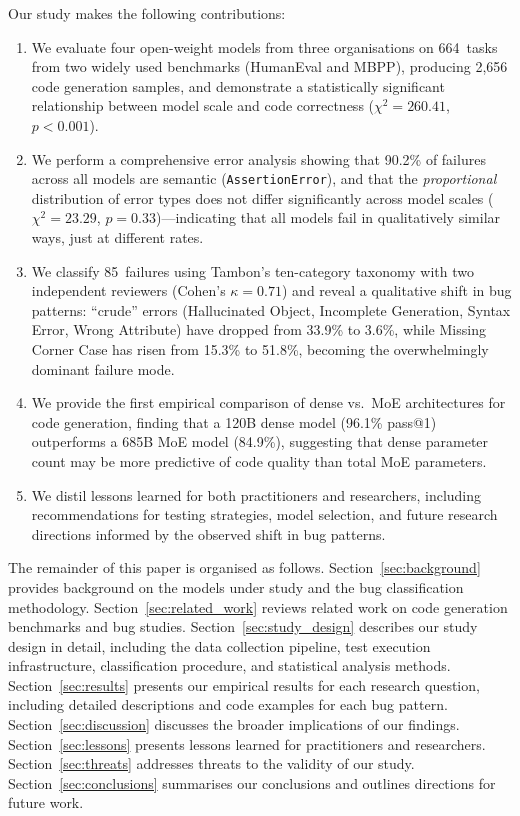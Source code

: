 \documentclass[smallextended]{svjour3}
\begin{document}
Our study makes the following contributions:

\begin{enumerate}
    \item We evaluate four open-weight models from three organisations on 664~tasks from two widely used benchmarks (HumanEval and MBPP), producing 2,656 code generation samples, and demonstrate a statistically significant relationship between model scale and code correctness ($\chi^2=260.41$, $p<0.001$).

    \item We perform a comprehensive error analysis showing that 90.2\% of failures across all models are semantic (\texttt{AssertionError}), and that the \emph{proportional} distribution of error types does not differ significantly across model scales ($\chi^2=23.29$, $p=0.33$)---indicating that all models fail in qualitatively similar ways, just at different rates.

    \item We classify 85~failures using Tambon's ten-category taxonomy with two independent reviewers (Cohen's $\kappa=0.71$) and reveal a qualitative shift in bug patterns: ``crude'' errors (Hallucinated Object, Incomplete Generation, Syntax Error, Wrong Attribute) have dropped from 33.9\% to 3.6\%, while Missing Corner Case has risen from 15.3\% to 51.8\%, becoming the overwhelmingly dominant failure mode.

    \item We provide the first empirical comparison of dense vs.\ MoE architectures for code generation, finding that a 120B dense model (96.1\% pass@1) outperforms a 685B MoE model (84.9\%), suggesting that dense parameter count may be more predictive of code quality than total MoE parameters.

    \item We distil lessons learned for both practitioners and researchers, including recommendations for testing strategies, model selection, and future research directions informed by the observed shift in bug patterns.
\end{enumerate}

The remainder of this paper is organised as follows. Section~\ref{sec:background} provides background on the models under study and the bug classification methodology. Section~\ref{sec:related_work} reviews related work on code generation benchmarks and bug studies. Section~\ref{sec:study_design} describes our study design in detail, including the data collection pipeline, test execution infrastructure, classification procedure, and statistical analysis methods. Section~\ref{sec:results} presents our empirical results for each research question, including detailed descriptions and code examples for each bug pattern. Section~\ref{sec:discussion} discusses the broader implications of our findings. Section~\ref{sec:lessons} presents lessons learned for practitioners and researchers. Section~\ref{sec:threats} addresses threats to the validity of our study. Section~\ref{sec:conclusions} summarises our conclusions and outlines directions for future work.
\end{document}
